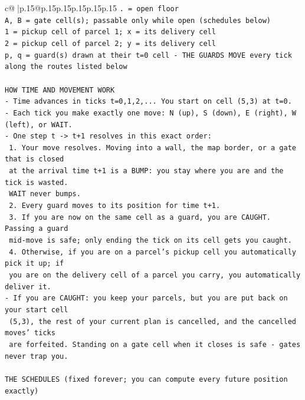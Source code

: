 \documentclass{article}
\begin{document}
{\begin{supertabular}{c@{$\;$}|p{.15\linewidth}@{}p{.15\linewidth}p{.15\linewidth}p{.15\linewidth}p{.15\linewidth}p{.15\linewidth}}
{{{\texttt{. = open floor} \\
\texttt{A, B = gate cell(s); passable only while open (schedules below)} \\
\texttt{1 = pickup cell of parcel 1; x = its delivery cell} \\
\texttt{2 = pickup cell of parcel 2; y = its delivery cell} \\
\texttt{p, q = guard(s) drawn at their t=0 cell {-} THE GUARDS MOVE every tick along the routes listed below} \\
\\ 
\texttt{HOW TIME AND MOVEMENT WORK} \\
\texttt{{-} Time advances in ticks t=0,1,2,... You start on cell (5,3) at t=0.} \\
\texttt{{-} Each tick you make exactly one move: N (up), S (down), E (right), W (left), or WAIT.} \\
\texttt{{-} One step t {-}> t+1 resolves in this exact order:} \\
\texttt{  1. Your move resolves. Moving into a wall, the map border, or a gate that is closed} \\
\texttt{     at the arrival time t+1 is a BUMP: you stay where you are and the tick is wasted.} \\
\texttt{     WAIT never bumps.} \\
\texttt{  2. Every guard moves to its position for time t+1.} \\
\texttt{  3. If you are now on the same cell as a guard, you are CAUGHT. Passing a guard} \\
\texttt{     mid{-}move is safe; only ending the tick on its cell gets you caught.} \\
\texttt{  4. Otherwise, if you are on a parcel's pickup cell you automatically pick it up; if} \\
\texttt{     you are on the delivery cell of a parcel you carry, you automatically deliver it.} \\
\texttt{{-} If you are CAUGHT: you keep your parcels, but you are put back on your start cell} \\
\texttt{  (5,3), the rest of your current plan is cancelled, and the cancelled moves' ticks} \\
\texttt{  are forfeited. Standing on a gate cell when it closes is safe {-} gates never trap you.} \\
\\ 
\texttt{THE SCHEDULES (fixed forever; you can compute every future position exactly)} \\
}}}
\end{supertabular}}
\end{document}
